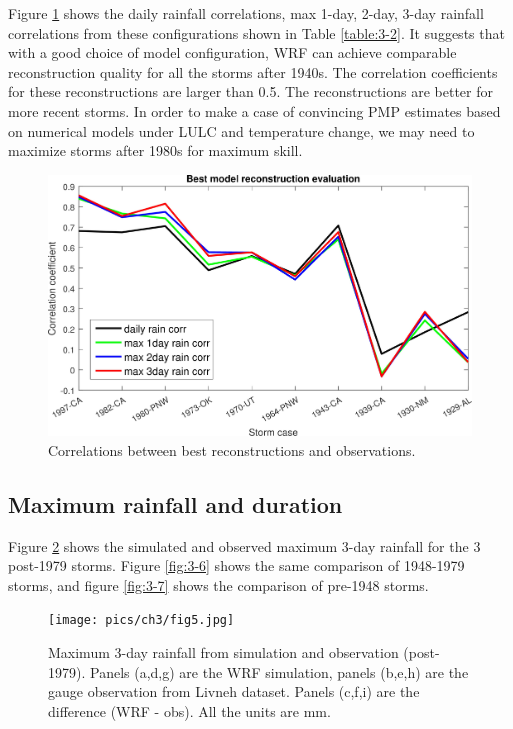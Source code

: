 Figure \ref{fig:3-4} shows the daily rainfall correlations, max 1-day, 2-day, 3-day rainfall correlations from these configurations shown in Table \ref{table:3-2}. It suggests that with a good choice of model configuration, WRF can achieve comparable reconstruction quality for all the storms after 1940s. The correlation coefficients for these reconstructions are larger than 0.5. The reconstructions are better for more recent storms. In order to make a case of convincing PMP estimates based on numerical models under LULC and temperature change, we may need to maximize storms after 1980s for maximum skill.

\begin{figure}[htbp]
	\includegraphics[width=\linewidth]{pics/ch3/fig4.jpg}
	\caption{Correlations between best reconstructions and observations.}
	\label{fig:3-4}
\end{figure}

\subsection{Maximum rainfall and duration }

Figure \ref{fig:3-5} shows the simulated and observed maximum 3-day rainfall for the 3 post-1979 storms. Figure \ref{fig:3-6} shows the same comparison of 1948-1979 storms, and figure \ref{fig:3-7} shows the comparison of pre-1948 storms.

\begin{figure}[htbp]
	\texttt{[image: pics/ch3/fig5.jpg]}
	\caption{Maximum 3-day rainfall from simulation and observation (post-1979). Panels (a,d,g) are the WRF simulation, panels (b,e,h) are the gauge observation from Livneh dataset. Panels (c,f,i) are the difference (WRF - obs). All the units are mm.}
	\label{fig:3-5}
\end{figure}

